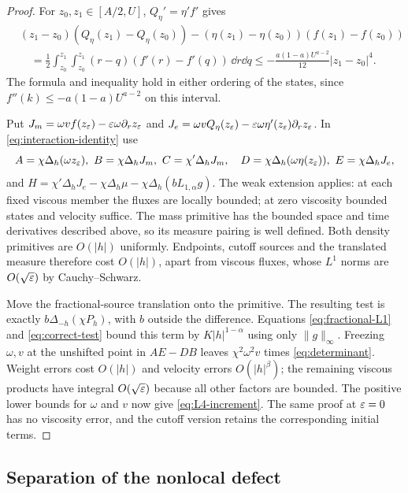 \begin{proof}
For $z_0,z_1\in[A/2,U]$, $Q_\eta'=\eta'f'$ gives
\begin{align}
 &(z_1-z_0)(Q_\eta(z_1)-Q_\eta(z_0))
 -(\eta(z_1)-\eta(z_0))(f(z_1)-f(z_0))\nonumber\\
 &\quad=\frac12\int_{z_0}^{z_1}\int_{z_0}^{z_1}
 (r-q)(f'(r)-f'(q))\,\dd r\dd q
 \leq-\frac{a(1-a)U^{a-2}}{12}|z_1-z_0|^4.\label{eq:determinant}
\end{align}
The formula and inequality hold in either ordering of the states, since
$f''(k)\leq-a(1-a)U^{a-2}$ on this interval.

Put $J_m=\omega vf(z_\varepsilon)-\varepsilon\omega\partial_rz_\varepsilon$ and
$J_e=\omega vQ_\eta(z_\varepsilon)-\varepsilon\omega\eta'(z_\varepsilon)\partial_rz_\varepsilon$.
In \eqref{eq:interaction-identity} use
\[
 A=\chi\Delta_h(\omega z_\eps),\ B=\chi\Delta_hJ_m,
 \ C=\chi'\Delta_hJ_m,\quad
 D=\chi\Delta_h(\omega\eta(z_\eps)),\ E=\chi\Delta_hJ_e,
\]
and $H=\chi'\Delta_hJ_e-\chi\Delta_h\mu
-\chi\Delta_h(bL_{1,\alpha}g)$. The weak extension applies: at each
fixed viscous member the fluxes are locally bounded; at zero viscosity
bounded states and velocity suffice. The mass primitive has the bounded
space and time derivatives described above, so its measure pairing is
well defined. Both density primitives are $O(|h|)$ uniformly. Endpoints,
cutoff sources and the translated measure therefore cost $O(|h|)$,
apart from viscous fluxes, whose $L^1$ norms are $O(\sqrt{\varepsilon})$ by
Cauchy--Schwarz.

Move the fractional-source translation onto the primitive. The resulting
test is exactly $b\Delta_{-h}(\chi P_h)$, with $b$ outside the difference.
Equations \eqref{eq:fractional-L1} and \eqref{eq:correct-test} bound this
term by $K|h|^{1-\alpha}$ using only $\|g\|_\infty$.
Freezing $\omega,v$ at the unshifted point in $AE-DB$ leaves
$\chi^2\omega^2v$ times \eqref{eq:determinant}. Weight errors cost
$O(|h|)$ and velocity errors $O(|h|^\beta)$; the remaining viscous
products have integral $O(\sqrt{\varepsilon})$ because all other factors are
bounded. The positive lower bounds for $\omega$ and $v$ now give
\eqref{eq:L4-increment}. The same proof at $\varepsilon=0$ has no viscosity
error, and the cutoff version retains the corresponding initial terms.
\end{proof}

\subsection{Separation of the nonlocal defect}

